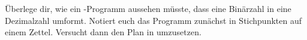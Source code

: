 \documentclass[10pt, a4paper, final]{scrartcl}
\begin{document}
\begin{aufgabe}[symbol=\Large\symStern\yspace\symLaptop\yspace\symPartner]
	Überlege dir, wie ein -Programm aussehen müsste, dass eine Binärzahl in eine Dezimalzahl umformt. Notiert euch das Programm zunächst in Stichpunkten auf einem Zettel. Versucht dann den Plan in  umzusetzen.
\end{aufgabe}
\end{document}
